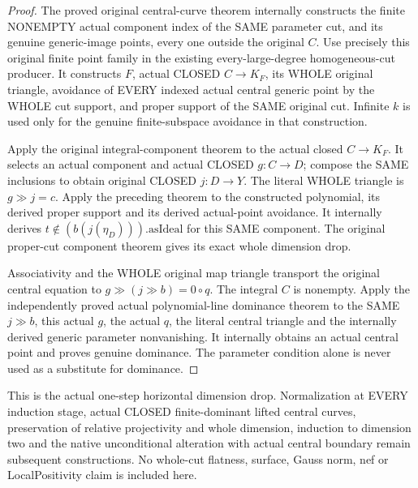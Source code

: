 \begin{proof}
The proved original central-curve theorem internally constructs the
finite NONEMPTY actual component index of the SAME parameter cut,
and its genuine generic-image points, every one outside the original
$C$. Use precisely this original finite point family in the existing
every-large-degree homogeneous-cut producer. It constructs $F$,
actual CLOSED $C\to K_F$, its WHOLE original triangle, avoidance of
EVERY indexed actual central generic point by the WHOLE cut support,
and proper support of the SAME original cut. Infinite $k$ is used
only for the genuine finite-subspace avoidance in that construction.

Apply the original integral-component theorem to the actual closed
$C\to K_F$. It selects an actual component and actual CLOSED
$g:C\to D$; compose the SAME inclusions to obtain original CLOSED
$j:D\to Y$. The literal WHOLE triangle is $g\gg j=c$. Apply the
preceding theorem to the constructed polynomial, its derived proper
support and its derived actual-point avoidance. It internally derives
$t\notin (b(j(\eta_D))).\mathrm{asIdeal}$ for this SAME component.
The original proper-cut component theorem gives its exact whole
dimension drop.

Associativity and the WHOLE original map triangle transport the
original central equation to $g\gg(j\gg b)=0\circ q$. The integral
$C$ is nonempty. Apply the independently proved actual polynomial-line
dominance theorem to the SAME $j\gg b$, this actual $g$, the actual
$q$, the literal central triangle and the internally derived generic
parameter nonvanishing. It internally obtains an actual central point
and proves genuine dominance. The parameter condition alone is never
used as a substitute for dominance.
\end{proof}

This is the actual one-step horizontal dimension drop. Normalization
at EVERY induction stage, actual CLOSED finite-dominant lifted central
curves, preservation of relative projectivity and whole dimension,
induction to dimension two and the native unconditional alteration
with actual central boundary remain subsequent constructions. No
whole-cut flatness, surface, Gauss norm, nef or LocalPositivity claim
is included here.
